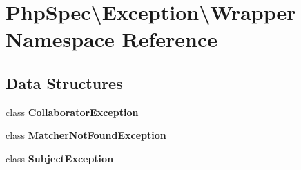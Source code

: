 \section{Php\+Spec\textbackslash{}Exception\textbackslash{}Wrapper Namespace Reference}
\label{namespace_php_spec_1_1_exception_1_1_wrapper}
\subsection*{Data Structures}
\begin{DoxyCompactItemize}
\item 
class {\bf Collaborator\+Exception}
\item 
class {\bf Matcher\+Not\+Found\+Exception}
\item 
class {\bf Subject\+Exception}
\end{DoxyCompactItemize}

